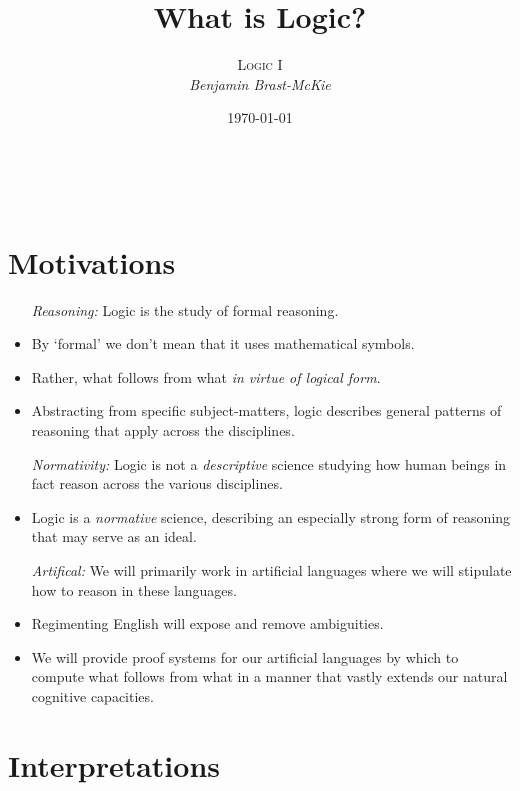 \documentclass[a4paper, 11pt]{article} %
\title{\textbf{What is Logic?}} %
\author{\textsc{Logic I}\\ \em Benjamin Brast-McKie} %
\date{\today} %
\makeatletter
\renewcommand{\maketitle}{
\begin{flushright}
{\LARGE\@title}

\vspace{10pt}

{\@author}
\\ \@date
\end{flushright}
}
\makeatother
\begin{document}
\maketitle %

\thispagestyle{empty}


\section*{Motivations}

\begin{itemize}[leftmargin=1in,labelsep=.15in]
  \item[\it Reasoning:] Logic is the study of formal reasoning.
    \item By `formal' we don't mean that it uses mathematical symbols.
    \item Rather, what follows from what \textit{in virtue of logical form}.
    \item Abstracting from specific subject-matters, logic describes general patterns of reasoning that apply across the disciplines. %
  \item[\it Normativity:] Logic is not a \textit{descriptive} science studying how human beings in fact reason across the various disciplines.
    \item Logic is a \textit{normative} science, describing an especially strong form of reasoning that may serve as an ideal.
  \item[\it Artifical:] We will primarily work in artificial languages where we will stipulate how to reason in these languages.
    \item Regimenting English will expose and remove ambiguities.
    \item We will provide proof systems for our artificial languages by which to compute what follows from what in a manner that vastly extends our natural cognitive capacities.
\end{itemize}



\section*{Interpretations}
\end{document}
